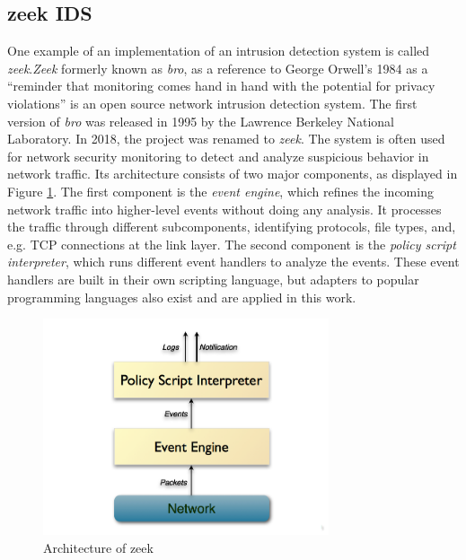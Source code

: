 \documentclass[
    fontsize=12pt,
    headings=small,
    parskip=half,           %
    bibliography=totoc,
    numbers=noenddot,       %
    open=any,               %
    ]{scrreprt}
\begin{document}
\subsection{zeek IDS}
One example of an implementation of an intrusion detection system is called \emph{zeek}.\emph{Zeek} formerly known as \emph{bro}, as a reference to George Orwell's 1984 as a ``reminder that monitoring comes hand in hand with the potential for privacy violations'' \cite{zeek2023} is an open source network intrusion detection system. The first version of \emph{bro} was released in 1995 by the Lawrence Berkeley National Laboratory. In 2018, the project was renamed to \emph{zeek}. The system is often used for network security monitoring to detect and analyze suspicious behavior in network traffic. Its architecture consists of two major components, as displayed in Figure \ref{fig:zeek_architecture}. The first component is the \emph{event engine}, which refines the incoming network traffic into higher-level events without doing any analysis. It processes the traffic through different subcomponents, identifying protocols, file types, and, e.g. TCP connections at the link layer. The second component is the \emph{policy script interpreter}, which runs different event handlers to analyze the events. These event handlers are built in their own scripting language, but adapters to popular programming languages also exist and are applied in this work.

\begin{figure}[H]
	\sffamily\footnotesize
	\includegraphics[width=0.75\textwidth]{pic/zeek_architecture.png}
	\unitlength=0.75mm
	\linethickness{0.4pt}
	\caption{Architecture of zeek \cite{zeek2023}}
	\label{fig:zeek_architecture}
\end{figure}
\end{document}
